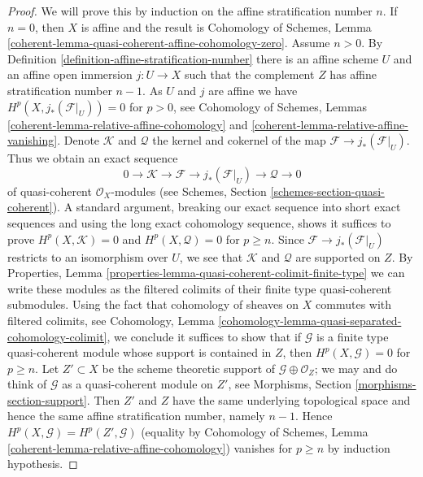 \begin{proof}
We will prove this by induction on the affine stratification number $n$.
If $n = 0$, then $X$ is affine and the result is
Cohomology of Schemes, Lemma
\ref{coherent-lemma-quasi-coherent-affine-cohomology-zero}.
Assume $n > 0$. By Definition \ref{definition-affine-stratification-number}
there is an affine scheme $U$ and an affine open immersion $j : U \to X$
such that the complement $Z$ has affine stratification number $n - 1$.
As $U$ and $j$ are affine we have $H^p(X, j_*(\mathcal{F}|_U)) = 0$
for $p > 0$, see Cohomology of Schemes, Lemmas
\ref{coherent-lemma-relative-affine-cohomology} and
\ref{coherent-lemma-relative-affine-vanishing}.
Denote $\mathcal{K}$ and $\mathcal{Q}$ the kernel and cokernel
of the map $\mathcal{F} \to j_*(\mathcal{F}|_U)$. Thus we obtain
an exact sequence
$$
0 \to \mathcal{K} \to \mathcal{F} \to j_*(\mathcal{F}|_U)
\to \mathcal{Q} \to 0
$$
of quasi-coherent $\mathcal{O}_X$-modules (see
Schemes, Section \ref{schemes-section-quasi-coherent}).
A standard argument, breaking our exact sequence into short
exact sequences and using the long exact cohomology sequence,
shows it suffices to prove $H^p(X, \mathcal{K}) = 0$
and $H^p(X, \mathcal{Q}) = 0$ for $p \geq n$.
Since $\mathcal{F} \to j_*(\mathcal{F}|_U)$ restricts
to an isomorphism over $U$, we see that $\mathcal{K}$
and $\mathcal{Q}$ are supported on $Z$.
By Properties, Lemma
\ref{properties-lemma-quasi-coherent-colimit-finite-type}
we can write these modules as the filtered colimits of
their finite type quasi-coherent submodules.
Using the fact that cohomology of sheaves on $X$ commutes
with filtered colimits, see
Cohomology, Lemma \ref{cohomology-lemma-quasi-separated-cohomology-colimit},
we conclude it suffices to show that if $\mathcal{G}$
is a finite type quasi-coherent module whose support
is contained in $Z$, then $H^p(X, \mathcal{G}) = 0$ for $p \geq n$.
Let $Z' \subset X$ be the scheme theoretic support of
$\mathcal{G} \oplus \mathcal{O}_Z$; we may and do think
of $\mathcal{G}$ as a quasi-coherent module on $Z'$, see
Morphisms, Section \ref{morphisms-section-support}.
Then $Z'$ and $Z$ have the same underlying topological space
and hence the same affine stratification number, namely $n - 1$.
Hence $H^p(X, \mathcal{G}) = H^p(Z', \mathcal{G})$
(equality by Cohomology of Schemes, Lemma
\ref{coherent-lemma-relative-affine-cohomology})
vanishes for $p \geq n$ by induction hypothesis.
\end{proof}

